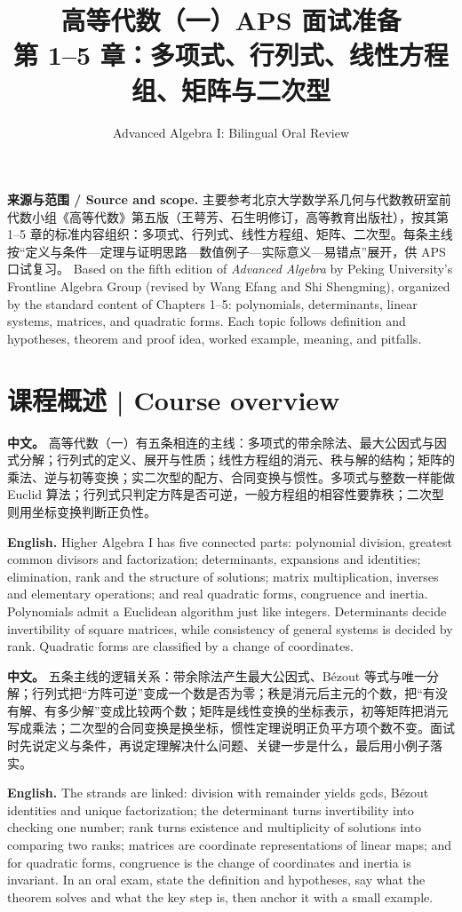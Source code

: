 \documentclass[UTF8,11pt,a4paper]{ctexart}
\title{高等代数（一）APS 面试准备\\[4pt]\large 第 1--5 章：多项式、行列式、线性方程组、矩阵与二次型}
\author{Advanced Algebra I: Bilingual Oral Review}
\date{}
\newcommand{\APS}[2]{\par\noindent\textbf{中文。} #1\par\noindent\textbf{English.} #2\par\smallskip}
\begin{document}
\maketitle

{\footnotesize\noindent\textbf{来源与范围 / Source and scope.} 主要参考北京大学数学系几何与代数教研室前代数小组《高等代数》第五版（王萼芳、石生明修订，高等教育出版社），按其第 1--5 章的标准内容组织：多项式、行列式、线性方程组、矩阵、二次型。每条主线按“定义与条件—定理与证明思路—数值例子—实际意义—易错点”展开，供 APS 口试复习。 Based on the fifth edition of \emph{Advanced Algebra} by Peking University's Frontline Algebra Group (revised by Wang Efang and Shi Shengming), organized by the standard content of Chapters 1--5: polynomials, determinants, linear systems, matrices, and quadratic forms. Each topic follows definition and hypotheses, theorem and proof idea, worked example, meaning, and pitfalls.\par}

\section*{课程概述 | Course overview}
\APS{高等代数（一）有五条相连的主线：多项式的带余除法、最大公因式与因式分解；行列式的定义、展开与性质；线性方程组的消元、秩与解的结构；矩阵的乘法、逆与初等变换；实二次型的配方、合同变换与惯性。多项式与整数一样能做 Euclid 算法；行列式只判定方阵是否可逆，一般方程组的相容性要靠秩；二次型则用坐标变换判断正负性。}{Higher Algebra I has five connected parts: polynomial division, greatest common divisors and factorization; determinants, expansions and identities; elimination, rank and the structure of solutions; matrix multiplication, inverses and elementary operations; and real quadratic forms, congruence and inertia. Polynomials admit a Euclidean algorithm just like integers. Determinants decide invertibility of square matrices, while consistency of general systems is decided by rank. Quadratic forms are classified by a change of coordinates.}
\APS{五条主线的逻辑关系：带余除法产生最大公因式、Bézout 等式与唯一分解；行列式把“方阵可逆”变成一个数是否为零；秩是消元后主元的个数，把“有没有解、有多少解”变成比较两个数；矩阵是线性变换的坐标表示，初等矩阵把消元写成乘法；二次型的合同变换是换坐标，惯性定理说明正负平方项个数不变。面试时先说定义与条件，再说定理解决什么问题、关键一步是什么，最后用小例子落实。}{The strands are linked: division with remainder yields gcds, Bézout identities and unique factorization; the determinant turns invertibility into checking one number; rank turns existence and multiplicity of solutions into comparing two ranks; matrices are coordinate representations of linear maps; and for quadratic forms, congruence is the change of coordinates and inertia is invariant. In an oral exam, state the definition and hypotheses, say what the theorem solves and what the key step is, then anchor it with a small example.}
\end{document}
